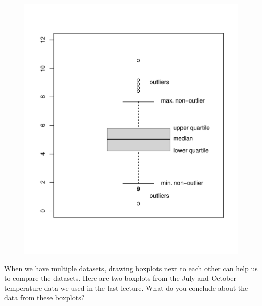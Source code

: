 \documentclass[
  letterpaper,
]{report}
\newenvironment{Shaded}{\begin{snugshade}}{\end{snugshade}}
\newcommand{\AttributeTok}[1]{\textcolor[rgb]{0.40,0.45,0.13}{#1}}
\newcommand{\FunctionTok}[1]{\textcolor[rgb]{0.28,0.35,0.67}{#1}}
\newcommand{\NormalTok}[1]{\textcolor[rgb]{0.00,0.23,0.31}{#1}}
\newcommand{\OtherTok}[1]{\textcolor[rgb]{0.00,0.23,0.31}{#1}}
\newcommand{\SpecialCharTok}[1]{\textcolor[rgb]{0.37,0.37,0.37}{#1}}
\newcommand{\StringTok}[1]{\textcolor[rgb]{0.13,0.47,0.30}{#1}}
\theoremstyle{definition}
\theoremstyle{definition}
\theoremstyle{remark}
\begin{document}
\begin{figure}

{\centering \includegraphics{sections/L02-dataviz_files/figure-pdf/boxplot1-1.pdf}

}

\end{figure}

When we have multiple datasets, drawing boxplots next to each other can
help us to compare the datasets. Here are two boxplots from the July and
October temperature data we used in the last lecture. What do you
conclude about the data from these boxplots?

\begin{Shaded}
\end{Shaded}
\end{document}
